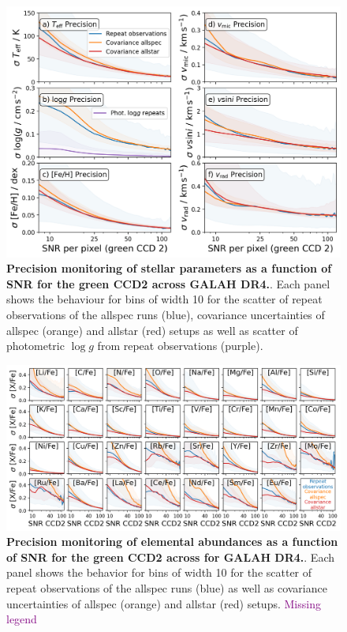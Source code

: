 \documentclass[
  journal=pasa,
  manuscript=research-paper, %
  year=2023,
  volume=37
]{cup-journal}
\newcommand{\SB}[1]{{\textcolor{purple}{#1}}}
\newcommand{\logg}{$\log g$\xspace}
\begin{document}
\begin{figure}[ht]
 \centering
 \includegraphics[width=\textwidth]{figures/galah_dr4_precision_parameters.png}
 \caption{\textbf{Precision monitoring of stellar parameters as a function of SNR for the green CCD2 across GALAH DR4.}. Each panel shows the behaviour for bins of width 10 for the scatter of repeat observations of the allspec runs (blue), covariance uncertainties of allspec (orange) and allstar (red) setups as well as scatter of photometric \logg from repeat observations (purple).}
 \label{fig:galah_dr4_precision_parameters}
\end{figure}

\begin{figure}[ht]
 \centering
 \includegraphics[width=\textwidth]{figures/galah_dr4_precision_abundances.png}
 \caption{\textbf{Precision monitoring of elemental abundances as a function of SNR for the green CCD2 across for GALAH DR4.}. Each panel shows the behavior for bins of width 10 for the scatter of repeat observations of the allspec runs (blue) as well as covariance uncertainties of allspec (orange) and allstar (red) setups. \SB{Missing legend}}
 \label{fig:galah_dr4_precision_abundances}
\end{figure}
\end{document}

